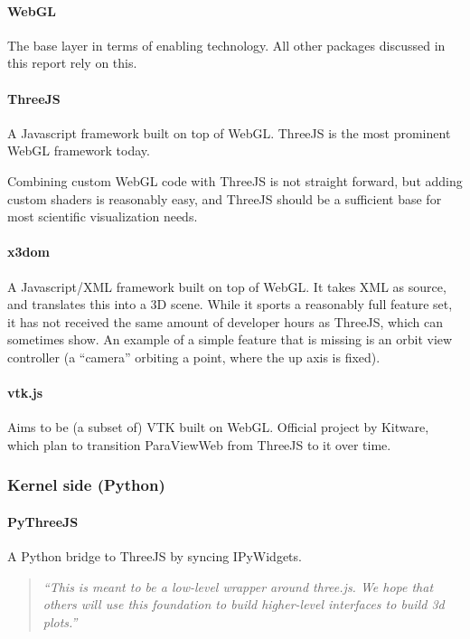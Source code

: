 \paragraph{WebGL}

The base layer in terms of enabling technology. All other packages
discussed in this report rely on this.

\paragraph{ThreeJS}

A Javascript framework built on top of WebGL. ThreeJS is the most
prominent WebGL framework today.

Combining custom WebGL code with ThreeJS is not straight forward, but
adding custom shaders is reasonably easy, and ThreeJS should be a
sufficient base for most scientific visualization needs.

\paragraph{x3dom}

A Javascript/XML framework built on top of WebGL. It takes XML as
source, and translates this into a 3D scene. While it sports a
reasonably full feature set, it has not received the same amount of
developer hours as ThreeJS, which can sometimes show. An example of a
simple feature that is missing is an orbit view controller (a ``camera''
orbiting a point, where the up axis is fixed).

\paragraph{vtk.js}

Aims to be (a subset of) VTK built on WebGL. Official project by
Kitware, which plan to transition ParaViewWeb from ThreeJS to it over
time.

\subsubsection{Kernel side (Python)}

\paragraph{PyThreeJS}

A Python bridge to ThreeJS by syncing IPyWidgets.

\begin{quote}
\emph{``This is meant to be a low-level wrapper around three.js. We hope
that others will use this foundation to build higher-level interfaces to
build 3d plots.''}
\end{quote}

